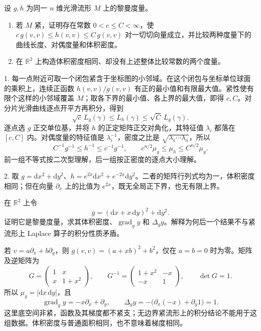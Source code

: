 \BookExercises

\begin{exercise}\label{g3:ex:metric-convex-comparison}
	设 \(g,h\) 为同一 \(n\) 维光滑流形 \(M\) 上的黎曼度量。
	\begin{enumerate}
		\item 若 \(M\) 紧，证明存在常数 \(0<c\le C<\infty\)，使 \(c\,g(v,v)\le h(v,v)\le C\,g(v,v)\) 对一切切向量成立，并比较两种度量下的曲线长度、对偶度量和体积密度。
		\item 在 \(\mathbb R^2\) 上构造体积密度相同、却没有上述整体比较常数的两个度量。
	\end{enumerate}
\end{exercise}
\begin{solution}
	1. 每一点附近可取一个闭包紧含于坐标图的小邻域。在这个闭包与坐标单位球面的乘积上，连续正函数 \(h(v,v)/g(v,v)\) 有正的最小值和有限最大值。紧性使有限个这样的小邻域覆盖 \(M\)；取各下界的最小值、各上界的最大值，即得 \(c,C\)。对分片光滑曲线逐点开平方再积分，得到
	\[
		\sqrt c\,L_g(\gamma)\le L_h(\gamma)\le\sqrt C\,L_g(\gamma).
	\]
	逐点选 \(g\) 正交单位基，并将 \(h\) 的正定矩阵正交对角化，其特征值 \(\lambda_i\) 都落在 \([c,C]\) 内。对偶度量的特征值是 \(\lambda_i^{-1}\)，密度之比是 \(\sqrt{\lambda_1\cdots\lambda_n}\)，所以
	\[
		C^{-1}g^{-1}\le h^{-1}\le c^{-1}g^{-1},\qquad
		c^{n/2}\mu_g\le\mu_h\le C^{n/2}\mu_g.
	\]
	前一组不等式按二次型理解，后一组按正密度的逐点大小理解。

	2. 取 \(g=\mathrm dx^2+\mathrm dy^2\)、\(h=e^{2x}\mathrm dx^2+e^{-2x}\mathrm dy^2\)。二者的矩阵行列式均为一，体积密度相同；但在向量 \(\partial_x\) 上的比值为 \(e^{2x}\)，既无全局正下界，也无有限上界。
\end{solution}

\begin{exercise}\label{g3:ex:non-diagonal-gradient}
	在 \(\mathbb R^2\) 上令
	\[
		g=(\mathrm dx+x\,\mathrm dy)^2+\mathrm dy^2.
	\]
	证明它是黎曼度量，求其体积密度、\(\operatorname{grad}_g y\) 和 \(\Delta_g y\)。解释为何后一个结果不与紧流形上 Laplace 算子的积分性质矛盾。
\end{exercise}
\begin{solution}
	若 \(v=a\partial_x+b\partial_y\)，则 \(g(v,v)=(a+xb)^2+b^2\)，仅在 \(a=b=0\) 时为零。矩阵及逆矩阵为
	\[
		G=\begin{pmatrix}1&x\\x&1+x^2\end{pmatrix},\qquad
		G^{-1}=\begin{pmatrix}1+x^2&-x\\-x&1\end{pmatrix},\qquad
		\det G=1.
	\]
	所以 \(\mu_g=|\mathrm dx\,\mathrm dy|\)，且
	\[
		\operatorname{grad}_g y=-x\partial_x+\partial_y,\qquad
		\Delta_g y=-\bigl(\partial_x(-x)+\partial_y1\bigr)=1.
	\]
	这里底空间非紧，函数及其梯度都不紧支；无边界紧流形上的积分结论不能用于这组数据。体积密度与普通面积相同，也不意味着梯度相同。
\end{solution}

